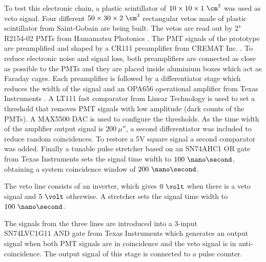 \begin{enumerate}
To test this electronic chain, a plastic scintillator of $10 \times 10 \times 1~\cm^3$ was used as veto signal. Four different $50\times 30 \times 2~\cm^3$  rectangular vetos made of plastic scintillator from Saint-Gobain \cite{VetoAveiro} are being built. The vetos are read out by $2$" R2154-02 PMTs from Hamamatsu Photonics \cite{DataSheetPMTsAveiro}. The PMT signals of the prototype are preamplified and shaped by a CR111 preamplifier from CREMAT Inc. \cite{CREMATPreAmplifierDataSheet}. To reduce electronic noise and signal loss, both preamplifiers are connected as close as possible to the PMTs and they are placed inside aluminium boxes which act as Faraday cages. Each preamplifier is followed by a differentiator stage which reduces the width of the signal and an OPA656 operational amplifier from Texas Instruments \cite{OPA656}. A LT111 fast comparator from Linear Technology \cite{LT111} is used to set a threshold that removes PMT signals with low amplitude (dark counts of the PMTs). A MAX5500 DAC is used to configure the thresholds. As the time width of the amplifier output signal is $200~\mu\second$, a second differentiator was included to reduce random coincidences. To restore a 5V square signal a second comparator was added. Finally a tunable pulse stretcher based on an SN74AHC1 OR gate from Texas Instruments \cite{Stretcher} sets the signal time width to $100~\nano\second$, obtaining a system coincidence window of $200~\nano\second$.

The veto line consists of an inverter, which gives $0~\volt$ when there is a veto signal and $5~\volt$ otherwise. A stretcher sets the signal time width to $100~\nano\second$.

The signals from the three lines are introduced into a 3-input \\ SN74LVC1G11 AND gate from Texas Instruments \cite{ANDGate} which generates an output signal when both PMT signals are in coincidence and the veto signal is in anti-coincidence. The output signal of this stage is connected to a pulse counter. 


\end{enumerate}

